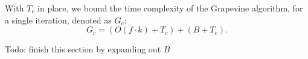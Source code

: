With $T_c$ in place, we bound the time complexity of the \textsf{Grapevine}
algorithm, for a single iteration, denoted as $G_c$:
\[
G_c = (O(f\cdot k) + T_c) + (B + T_c).
\]

Todo: finish this section by expanding out $B$



